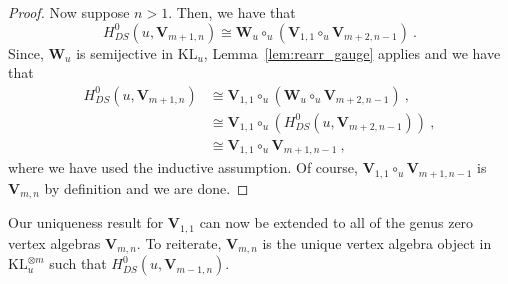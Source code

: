 \documentclass[a4paper]{article}
\def \KL{\mathrm{KL}}
\def\W{\mathbf{W}}
\def\V{\mathbf{V}}
\begin{document}
\begin{proof}
Now suppose $n>1$. Then, we have that
\begin{equation*}
	H^0_{DS}(u,\V_{m+1,n}) \cong \W_u\circ_u(\V_{1,1}\circ_u \V_{m+2,n-1})~.
\end{equation*}
Since, $\W_u$ is semijective in $\KL_u$, Lemma~\ref{lem:rearr_gauge} applies and we have that
\begin{equation}\nonumber
	\begin{split}
	H^0_{DS}(u,\V_{m+1,n}) &\cong \V_{1,1}\circ_u(\W_u\circ_u\V_{m+2,n-1})~,\\
	&\cong \V_{1,1} \circ_u (H^0_{DS}(u,\V_{m+2,n-1}))~,\\
	&\cong \V_{1,1}\circ_u \V_{m+1,n-1}~,
	\end{split}
\end{equation}
where we have used the inductive assumption. Of course, $\V_{1,1}\circ_u \V_{m+1,n-1}$ is $\V_{m,n}$ by definition and we are done.
\end{proof}
Our uniqueness result for $\V_{1,1}$ can now be extended to all of the genus zero vertex algebras $\V_{m,n}$. To reiterate, $\V_{m,n}$ is the unique vertex algebra object in $\KL_u^{\otimes m}$ such that $H^0_{DS}(u, \V_{m-1,n})$.
\end{document}
